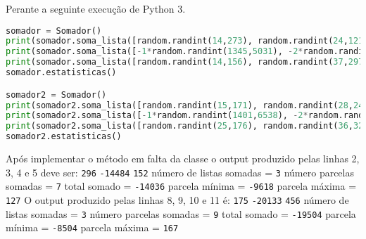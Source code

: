 \documentclass[37pt,varwidth=16cm,border=17pt]{standalone}
\begin{document}
Perante a seguinte execução de Python 3. 

\begin{lstlisting}[language=Python]
somador = Somador()
print(somador.soma_lista([random.randint(14,273), random.randint(24,121), random.randint(24,140)]))
print(somador.soma_lista([-1*random.randint(1345,5031), -2*random.randint(1189, 6392)]))
print(somador.soma_lista([random.randint(14,156), random.randint(37,297)]))
somador.estatisticas()

somador2 = Somador()
print(somador2.soma_lista([random.randint(15,171), random.randint(28,248)]))
print(somador2.soma_lista([-1*random.randint(1401,6538), -2*random.randint(1691, 5503), -3*random.randint(1283,7453)]))
print(somador2.soma_lista([random.randint(25,176), random.randint(36,329), random.randint(7,159), random.randint(5,313)]))
somador2.estatisticas()
\end{lstlisting}


Após implementar o método em falta da classe o output produzido pelas linhas 2, 3, 4 e 5 deve ser:
\newline 
\verb+296+\newline
\verb+-14484+\newline
\verb+152+\newline
número de listas somadas = \verb+3+\newline
número parcelas somadas  = \verb+7+\newline
total somado             = \verb+-14036+\newline
parcela mínima           = \verb+-9618+\newline
parcela máxima           = \verb+127+\newline
\newline
\newline
O output produzido pelas linhas 8, 9, 10 e 11 é:
\newline
\verb+175+\newline
\verb+-20133+\newline
\verb+456+\newline
número de listas somadas = \verb+3+\newline
número parcelas somadas  = \verb+9+\newline
total somado             = \verb+-19504+\newline
parcela mínima           = \verb+-8504+\newline
parcela máxima           = \verb+167+\newline
\end{document}
